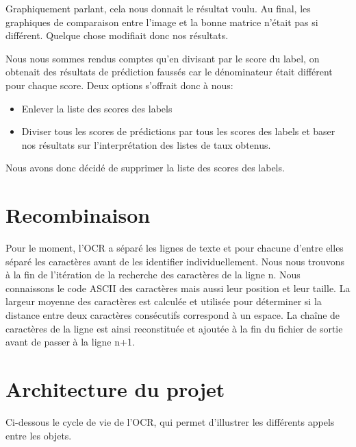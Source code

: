 \documentclass[a4paper, 12pt]{article}
\begin{document}
Graphiquement parlant, cela nous donnait le résultat voulu. Au final, les graphiques de comparaison entre l'image et la bonne matrice n'était pas si différent. Quelque chose modifiait donc nos résultats.

Nous nous sommes rendus comptes qu'en divisant par le score du label, on obtenait des résultats de prédiction faussés car le dénominateur était différent pour chaque score. Deux options s'offrait donc à nous:
\begin{itemize}
\item Enlever la liste des scores des labels
\item Diviser tous les scores de prédictions par tous les scores des labels et baser nos résultats sur l'interprétation des listes de taux obtenus.
\end{itemize}
Nous avons donc décidé de supprimer la liste des scores des labels.

\section{Recombinaison}
Pour le moment, l'OCR a séparé les lignes de texte et pour chacune d'entre elles séparé les caractères avant de les identifier individuellement. Nous nous trouvons à la fin de l'itération de la recherche des caractères de la ligne n. Nous connaissons le code ASCII des caractères mais aussi leur position et leur taille. La largeur moyenne des caractères est calculée et utilisée pour déterminer si la distance entre deux caractères consécutifs correspond à un espace. La chaîne de caractères de la ligne est ainsi reconstituée et ajoutée à la fin du fichier de sortie avant de passer à la ligne n+1.

\section{Architecture du projet}
Ci-dessous le cycle de vie de l'OCR, qui permet d'illustrer les différents appels entre les objets.
\end{document}
